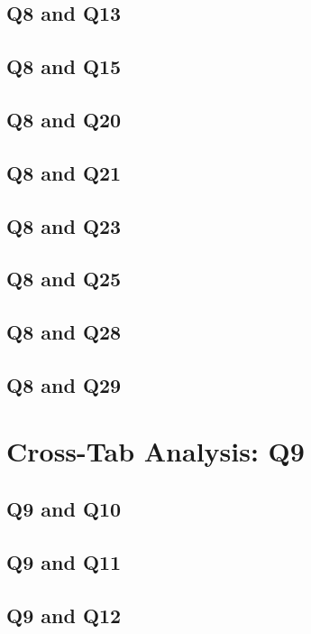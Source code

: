 \documentclass{report}
\begin{document}
\section{Q8 and Q13}\clearpage
\section{Q8 and Q15}\clearpage
\section{Q8 and Q20}\clearpage
\section{Q8 and Q21}\clearpage
\section{Q8 and Q23}\clearpage
\section{Q8 and Q25}\clearpage
\section{Q8 and Q28}\clearpage
\section{Q8 and Q29}\clearpage

\chapter{Cross-Tab Analysis: Q9}

\section{Q9 and Q10}\clearpage
\section{Q9 and Q11}\clearpage
\section{Q9 and Q12}\clearpage
\end{document}
